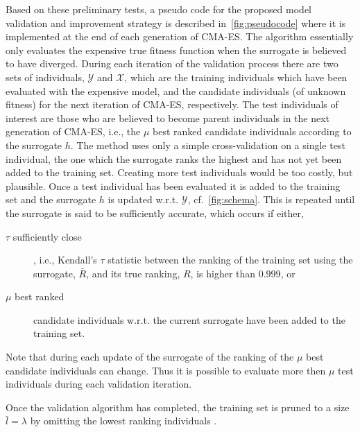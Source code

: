 Based on these preliminary tests, a pseudo code for the proposed model validation and improvement strategy is described in~\cref{fig:pseudocode} where it is implemented at the end of each generation of CMA-ES. The algorithm essentially only evaluates the expensive true fitness function when the surrogate is believed to have diverged. During each iteration of the validation process there are two sets of individuals, $\mathcal{Y}$ and $\mathcal{X}$, which are the training individuals  which have been evaluated with the expensive model, and the candidate individuals (of unknown fitness) for the next iteration of CMA-ES, respectively. The test individuals  of interest are those who are believed to become parent individuals  in the next generation of CMA-ES, i.e.,  the $\mu$ best ranked candidate individuals according to the surrogate $h$. The method uses only a simple cross-validation on a single test individual, the one which the surrogate ranks the highest and has not yet been added to the training set. Creating more test individuals  would be too costly, but plausible. Once a test individual has been evaluated it is added to the training set and the surrogate $h$ is updated w.r.t. $\mathcal{Y}$, cf.~\cref{fig:schema}. This is repeated until the surrogate is said to be sufficiently accurate, which occurs if either,
\begin{description}
  \item[$\tau$ sufficiently close], i.e.,  Kendall's $\tau$ statistic between the ranking of the training set using the surrogate, $\bar{R}$, and its true ranking, $R$, is higher than $0.999$, or 
  \item[$\mu$ best ranked] candidate individuals w.r.t. the current surrogate have been added to the training set.
\end{description}
Note that during each update of the surrogate of the ranking of the $\mu$ best candidate individuals can change. Thus it is possible to evaluate more then $\mu$ test individuals  during each validation iteration. 

Once the validation algorithm has completed, the training set is pruned to a size $\bar{l}=\lambda$ by omitting the lowest ranking individuals . 

